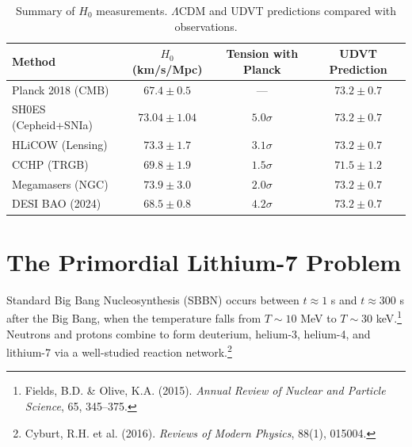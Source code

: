 \documentclass[12pt,a4paper]{book}
\theoremstyle{definition}
\theoremstyle{remark}
\begin{document}
\begin{table}[htbp]
\centering
\caption{Summary of $H_0$ measurements. $\Lambda$CDM and UDVT predictions compared with observations.}
\label{tab:H0_summary}
\begin{tabular}{@{}lccc@{}}
\toprule
\textbf{Method} & \textbf{$H_0$ (km/s/Mpc)} & \textbf{Tension with Planck} & \textbf{UDVT Prediction} \\
\midrule
Planck 2018 (CMB) & $67.4 \pm 0.5$ & --- & $73.2 \pm 0.7$ \\
SH0ES (Cepheid+SNIa) & $73.04 \pm 1.04$ & $5.0\sigma$ & $73.2 \pm 0.7$ \\
HLiCOW (Lensing) & $73.3 \pm 1.7$ & $3.1\sigma$ & $73.2 \pm 0.7$ \\
CCHP (TRGB) & $69.8 \pm 1.9$ & $1.5\sigma$ & $71.5 \pm 1.2$ \\
Megamasers (NGC) & $73.9 \pm 3.0$ & $2.0\sigma$ & $73.2 \pm 0.7$ \\
DESI BAO (2024) & $68.5 \pm 0.8$ & $4.2\sigma$ & $73.2 \pm 0.7$ \\
\bottomrule
\end{tabular}
\end{table}

\section{The Primordial Lithium-7 Problem}
\label{sec:lithium}

Standard Big Bang Nucleosynthesis (SBBN) occurs between $t \approx 1$ s and $t \approx 300$ s after the Big Bang, when the temperature falls from $T \sim 10$ MeV to $T \sim 30$ keV.\footnote{Fields, B.D. \& Olive, K.A. (2015). \textit{Annual Review of Nuclear and Particle Science}, 65, 345--375.} Neutrons and protons combine to form deuterium, helium-3, helium-4, and lithium-7 via a well-studied reaction network.\footnote{Cyburt, R.H. et al. (2016). \textit{Reviews of Modern Physics}, 88(1), 015004.}
\end{document}
